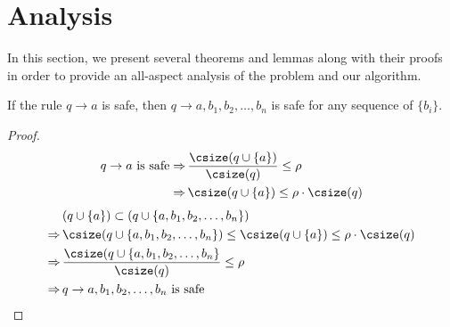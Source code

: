 \section{Analysis}
\label{sec:analysis}

%

In this section, we present several theorems and lemmas along with their proofs
in order to provide an all-aspect analysis of the problem and our algorithm.


\begin{lemma}
\label{lemma:rule}
  If the rule $q\rightarrow a$ is safe,
  then $q\rightarrow a, b_1,b_2,\dots,b_n$ is safe for any sequence of $\{b_i\}$.
\end{lemma}
\begin{proof}
  \begin{align*}
    \text{$q\rightarrow a$ is safe}
    \Rightarrow
    &\, \frac{\csize(q\cup\{a\})}{\csize(q)} \le \rho \\
    \Rightarrow
    &\, \csize(q\cup\{a\}) \le \rho\cdot\csize(q)
  \end{align*}
  \begin{align*}
    &\, (q\cup\{a\}) \subset (q\cup\{a, b_1,b_2,\dots,b_n\}) \\
    \Rightarrow
    &\,  \csize(q\cup\{a, b_1,b_2,\dots,b_n\}) \leq \csize(q\cup\{a\}) \le \rho\cdot\csize(q) \\
    \Rightarrow
    &\, \frac{\csize(q\cup\{a, b_1,b_2,\dots,b_n\}}{\csize(q)} \le \rho \\
    \Rightarrow
    &\, \text{$q\rightarrow a, b_1,b_2,\dots,b_n$ is safe}
  \end{align*}
\end{proof}

